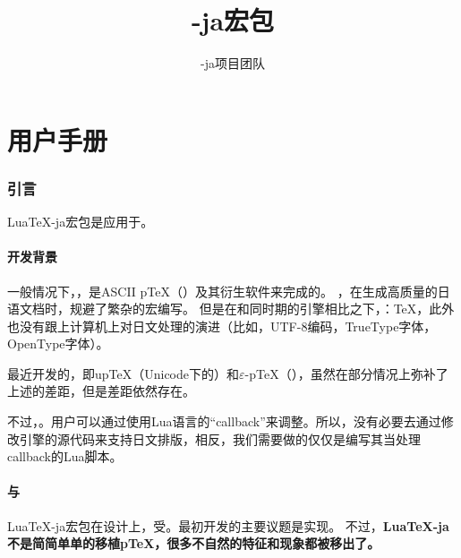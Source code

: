 \documentclass{ltjarticle}
\title{\LuaTeX-ja宏包}
\author{\LuaTeX-ja项目团队}
\date{}
\def\LuaTeX{Lua\TeX}
\def\pTeX{p\TeX}
\def\upTeX{up\TeX}
\def\eTeX{$\varepsilon$-\TeX}
\def\epTeX{$\varepsilon$-p\TeX}
\begin{document}
\maketitle
\tableofcontents
\part{用户手册}
\section{引言}
\LuaTeX-ja宏包是应用于。
\subsection{开发背景}
一般情况下，，是ASCII \pTeX（）及其衍生软件来完成的。
，在生成高质量的日语文档时，规避了繁杂的宏编写。
但是在和同时期的引擎相比之下，：\TeX，此外也没有跟上计算机上对日文处理的演进（比如，UTF-8编码，TrueType字体，OpenType字体）。

最近开发的，即\upTeX（Unicode下的）和\epTeX（），虽然在部分情况上弥补了上述的差距，但是差距依然存在。

不过，。用户可以通过使用Lua语言的“callback”来调整。所以，没有必要去通过修改引擎的源代码来支持日文排版，相反，我们需要做的仅仅是编写其当处理callback的Lua脚本。
\subsection{与}
\LuaTeX-ja宏包在设计上，受。最初开发的主要议题是实现。
不过，{\bf\LuaTeX-ja不是简简单单的移植\pTeX，很多不自然的特征和现象都被移出了。}
\end{document}
